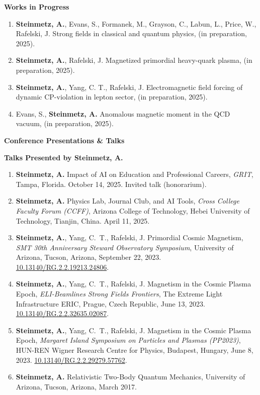 \documentclass[11pt]{article}
\begin{document}
\medskip

{\large\textbf{Works in Progress}}

\begin{enumerate}[leftmargin=*,nosep]
    \item \textbf{Steinmetz, A.}, Evans, S., Formanek, M., Grayson, C., Labun, L., Price, W., Rafelski, J. Strong fields in classical and quantum physics, (in preparation, 2025).
    \item \textbf{Steinmetz, A.}, Rafelski, J. Magnetized primordial heavy-quark plasma, (in preparation, 2025).
    \item \textbf{Steinmetz, A.}, Yang, C. T., Rafelski, J. Electromagnetic field forcing of dynamic CP-violation in lepton sector, (in preparation, 2025).
    \item Evans, S., \textbf{Steinmetz, A.} Anomalous magnetic moment in the QCD vacuum, (in preparation, 2025).
\end{enumerate}

\medskip

{\Large\textbf{Conference Presentations \& Talks}}

{\large\textbf{Talks Presented by Steinmetz, A.}}

\begin{enumerate}[leftmargin=*,nosep]
    \item \textbf{Steinmetz, A.} Impact of AI on Education and Professional Careers, \textit{GRIT}, Tampa, Florida. October 14, 2025. Invited talk (honorarium).
    \item \textbf{Steinmetz, A.} Physics Lab, Journal Club, and AI Tools, \textit{Cross College Faculty Forum (CCFF)}, Arizona College of Technology, Hebei University of Technology, Tianjin, China. April 11, 2025.
    \item \textbf{Steinmetz, A.}, Yang, C.~T., Rafelski, J. Primordial Cosmic Magnetism, \textit{SMT 30th Anniversary Steward Observatory Symposium}, University of Arizona, Tucson, Arizona, September 22, 2023.\\ \href{http://dx.doi.org/10.13140/RG.2.2.19213.24806}{10.13140/RG.2.2.19213.24806}.
    \item \textbf{Steinmetz, A.}, Yang, C.~T., Rafelski, J. Magnetism in the Cosmic Plasma Epoch, \textit{ELI-Beamlines Strong Fields Frontiers}, The Extreme Light Infrastructure ERIC, Prague, Czech Republic, June 13, 2023. \href{http://dx.doi.org/10.13140/RG.2.2.32635.02087}{10.13140/RG.2.2.32635.02087}.
    \item \textbf{Steinmetz, A.}, Yang, C.~T., Rafelski, J. Magnetism in the Cosmic Plasma Epoch, \textit{Margaret Island Symposium on Particles and Plasmas (PP2023)}, HUN-REN Wigner Research Centre for Physics, Budapest, Hungary, June 8, 2023. \href{http://dx.doi.org/10.13140/RG.2.2.29279.57762}{10.13140/RG.2.2.29279.57762}.
    \item \textbf{Steinmetz, A.} Relativistic Two-Body Quantum Mechanics, University of Arizona, Tucson, Arizona, March 2017.
\end{enumerate}
\end{document}

